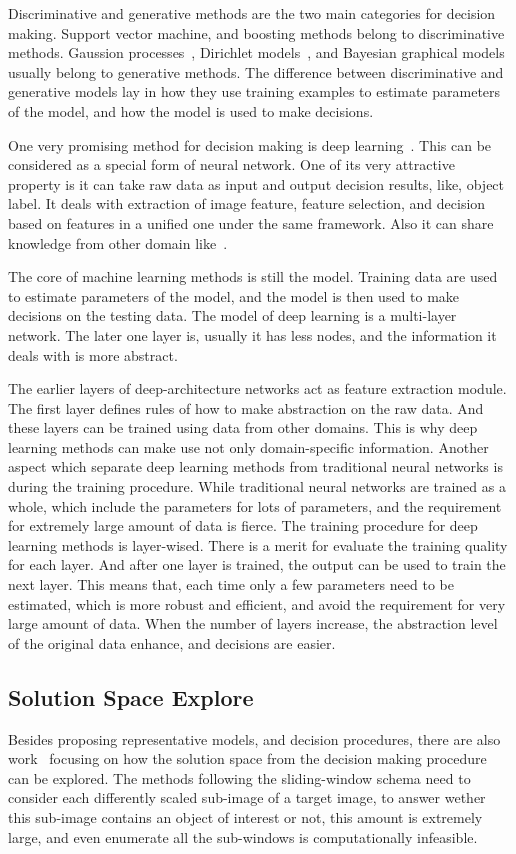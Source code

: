 Discriminative and generative methods are the two main categories for decision making.
Support vector machine, and boosting methods belong to discriminative methods. Gaussion processes~\cite{gprocess}, Dirichlet models~\cite{lda,dp,hdp}, and Bayesian graphical models~\cite{bgm} usually belong to generative methods. The difference between discriminative and generative models lay in how they use training examples to estimate parameters of the model, and how the model is used to make decisions.

One very promising method for decision making is deep learning~\cite{dlearn}. This can be considered as a special form of neural network. One of its very attractive property is it can take raw data as input and output decision results, like, object label. It deals with extraction of image feature, feature selection, and decision based on features in a unified one under the same framework. Also it can share knowledge from other domain like~\cite{tlsurvey}.

The core of machine learning methods is still the model. Training data are used to estimate  parameters of the model, and the model is then used to make decisions on the testing data. The model of deep learning is a multi-layer network. The later one layer is, usually it has less nodes, and the information it deals with is more abstract.

The earlier layers of deep-architecture networks act as feature extraction module. The first layer defines rules of how to make abstraction on the raw data. And these layers can be trained using  data from other domains. This is why deep learning methods can make use not only domain-specific information. Another aspect which separate deep learning methods from traditional neural networks is during the training procedure. While traditional neural networks are trained as a whole, which include the parameters for lots of parameters, and the requirement for extremely large amount of data is fierce. The training procedure for deep learning methods is layer-wised. There is a merit for evaluate the training quality for each layer. And after one layer is trained, the output can be used to train the next layer. This means that, each time only a few parameters need to be estimated, which is more robust and efficient, and avoid the requirement for very large amount of data. When the number of layers increase, the abstraction level of the original data enhance, and decisions are easier.


\subsection{Solution Space Explore}
Besides proposing representative models, and decision procedures, there are also work~\cite{408,spm,ciod} focusing on how the solution space from the decision making procedure can be explored. The methods following the sliding-window schema need to consider each differently scaled sub-image of a target image, to answer wether this sub-image contains an object of interest or not, this amount is extremely large, and even enumerate all the sub-windows is computationally infeasible.

